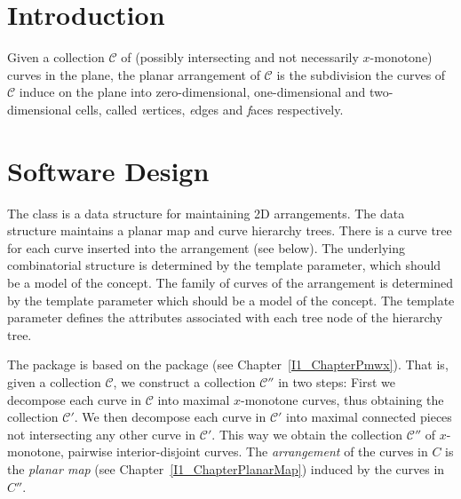


\section{Introduction}

Given a collection ${\mathcal C}$ of (possibly intersecting and not 
necessarily  $x$-monotone) curves in the plane, the planar arrangement of 
${\mathcal C}$ is the subdivision the curves of ${\mathcal C}$ induce on
the plane into zero-dimensional, one-dimensional and two-dimensional cells,
called {\emph vertices}, {\emph edges} and {\emph faces} respectively.

\section{Software Design}
 
The class  is a data
structure for maintaining 2D arrangements. The data structure
maintains a planar map and curve hierarchy trees. There is a curve
tree for each curve inserted into the arrangement (see below). The
underlying combinatorial structure is determined by the
 template parameter, which should be a model of the
 concept. The family of curves of the
arrangement is determined by the  template parameter which
should be a model of the  concept. The
 template parameter defines the attributes associated
with each tree node of the hierarchy tree.

The  package is based on the  package (see Chapter~\ref{I1_ChapterPmwx}). That is, given
a collection ${\mathcal C}$, we construct a collection 
${\mathcal C}''$ in two steps: First we decompose each curve in 
${\mathcal C}$ into maximal $x$-monotone curves, thus obtaining the 
collection ${\mathcal C}'$. We then decompose each curve in ${\mathcal C}'$ 
into maximal connected pieces not intersecting any other curve in 
${\mathcal C}'$. This way we obtain the collection ${\mathcal C}''$ of 
$x$-monotone, pairwise interior-disjoint curves.
The {\em arrangement} of the curves in $C$ is the
{\it planar map} (see Chapter~\ref{I1_ChapterPlanarMap})
induced by the curves in $C''$.

